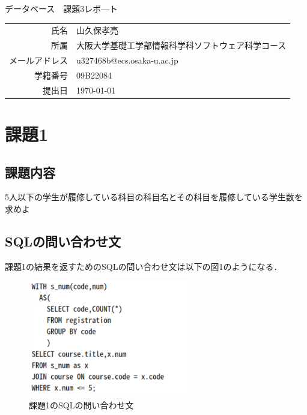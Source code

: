 \documentclass[dvipdfmx]{jarticle}
\begin{document}
\begin{titlepage}
    \begin{center}
        {\huge データベース　課題3レポ―ト}
        \vspace{180pt}\\
        \begin{tabular}{rl}
            氏名 & 山久保孝亮\\
            所属 & 大阪大学基礎工学部情報科学科ソフトウェア科学コース\\
            メールアドレス & u327468b@ecs.osaka-u.ac.jp\\
            学籍番号 & 09B22084\\
            提出日 & \today\\
        \end{tabular}
    \end{center}
\end{titlepage}
\section{課題1}
\subsection{課題内容}
5人以下の学生が履修している科目の科目名とその科目を履修している学生数を求めよ
\subsection{SQLの問い合わせ文}
課題1の結果を返すためのSQLの問い合わせ文は以下の図1のようになる．\\
\begin{figure}[h]
    \centering
    \includegraphics[width=7cm]{sql1.png}
    \caption{課題1のSQLの問い合わせ文}
\end{figure}
\end{document}
